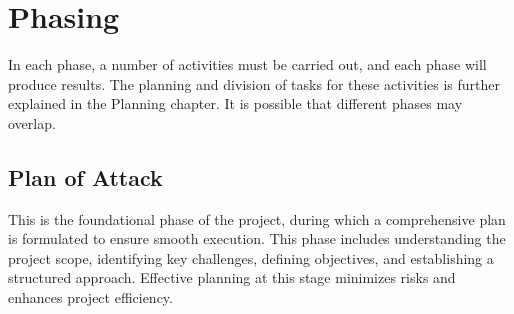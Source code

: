 \documentclass{article}
\begin{document}
\newpage
\section{Phasing}
In each phase, a number of activities must be carried out, and each phase will produce results.
The planning and division of tasks for these activities is further explained in the Planning chapter.
It is possible that different phases may overlap.

%
\subsection{Plan of Attack}
This is the foundational phase of the project, during which a comprehensive plan is formulated to ensure smooth execution.
This phase includes understanding the project scope, identifying key challenges, defining objectives, and establishing a structured approach.
Effective planning at this stage minimizes risks and enhances project efficiency.
\end{document}
